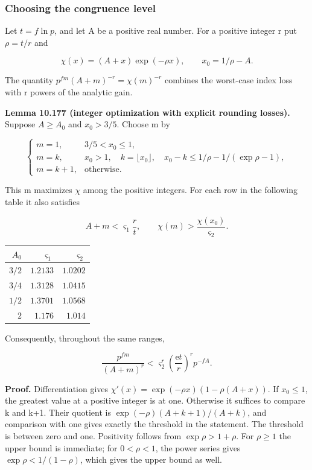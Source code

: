 \documentclass[
  11pt,
  a4paper,
]{article}
\newcounter{none} %
\begin{document}
\subsubsection{Choosing the congruence
level}\label{choosing-the-congruence-level}

Let \(t=f\ln p\), and let A be a positive real number. For a positive
integer r put \(\rho=t/r\) and

\[
\chi(x)=(A+x)\exp(-\rho x),\qquad x_0=1/\rho-A.
\tag{10.665}
\]

The quantity \(p^{fm}(A+m)^{-r}=\chi(m)^{-r}\) combines the worst-case
index loss with r powers of the analytic gain.

\textbf{Lemma 10.177 (integer optimization with explicit rounding
losses).} Suppose \(A\ge A_0\) and \(x_0>3/5\). Choose m by

\[
\begin{cases}
m=1,&3/5<x_0\le1,\\
m=k,&x_0>1,\quad k=\lfloor x_0\rfloor,
       \quad x_0-k\le 1/\rho-1/(\exp\rho-1),\\
m=k+1,&\text{otherwise}.
\end{cases}
\tag{10.666}
\]

This m maximizes \(\chi\) among the positive integers. For each row in
the following table it also satisfies

\[
A+m<\varsigma_1\frac r t,\qquad
\chi(m)>\frac{\chi(x_0)}{\varsigma_2}.
\tag{10.667}
\]

{\def\LTcaptype{none} %
\begin{longtable}[]{@{}rrr@{}}
\toprule\noalign{}
\(A_0\) & \(\varsigma_1\) & \(\varsigma_2\) \\
\midrule\noalign{}
\endhead
\bottomrule\noalign{}
\endlastfoot
\(3/2\) & \(1.2133\) & \(1.0202\) \\
\(3/4\) & \(1.3128\) & \(1.0415\) \\
\(1/2\) & \(1.3701\) & \(1.0568\) \\
\(2\) & \(1.176\) & \(1.014\) \\
\end{longtable}
}

Consequently, throughout the same ranges,

\[
\frac{p^{fm}}{(A+m)^r}
<\varsigma_2^r\left(\frac{\mathrm e t}{r}\right)^r p^{-fA}.
\tag{10.668}
\]

\textbf{Proof.} Differentiation gives
\(\chi'(x)=\exp(-\rho x)(1-\rho(A+x))\). If \(x_0\le1\), the greatest
value at a positive integer is at one. Otherwise it suffices to compare
k and k+1. Their quotient is \(\exp(-\rho)(A+k+1)/(A+k)\), and
comparison with one gives exactly the threshold in the statement. The
threshold is between zero and one. Positivity follows from
\(\exp\rho>1+\rho\). For \(\rho\ge1\) the upper bound is immediate; for
\(0<\rho<1\), the power series gives \(\exp\rho<1/(1-\rho)\), which
gives the upper bound as well.
\end{document}
